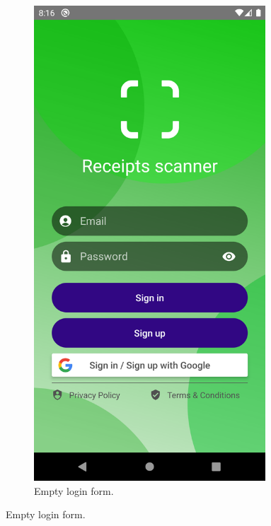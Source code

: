 \documentclass[
  digital, %
  table,   %
  oneside, %
  lof,     %
  lot,     %
]{fithesis3}
\begin{document}
\begin{figure}
\centering
\begin{subfigure}[t]{0.5\textwidth}
  \centering
  \includegraphics[width=0.95\textwidth]{figures/screens/android/light/login_screen}
  \caption{Empty login form.}
  \label{fig:login_screen}
\end{subfigure}

\end{figure}
\end{document}
